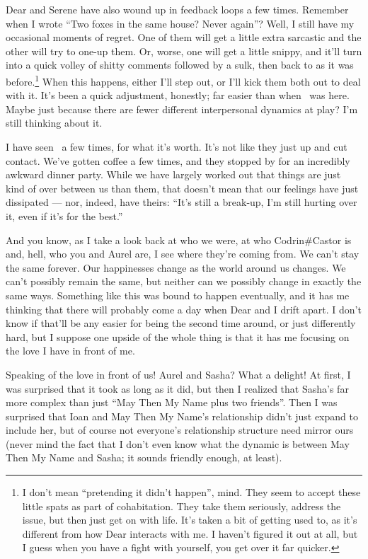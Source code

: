 Dear and Serene have also wound up in feedback loops a few times. Remember when I wrote ``Two foxes in the same house? Never again''? Well, I still have my occasional moments of regret. One of them will get a little extra sarcastic and the other will try to one-up them. Or, worse, one will get a little snippy, and it'll turn into a quick volley of shitty comments followed by a sulk, then back to as it was before.\footnote{I don't mean ``pretending it didn't happen'', mind. They seem to accept these little spats as part of cohabitation. They take them seriously, address the issue, but then just get on with life. It's taken a bit of getting used to, as it's different from how Dear interacts with me. I haven't figured it out at all, but I guess when you have a fight with yourself, you get over it far quicker.} When this happens, either I'll step out, or I'll kick them both out to deal with it. It's been a quick adjustment, honestly; far easier than when \Partner\ was here. Maybe just because there are fewer different interpersonal dynamics at play? I'm still thinking about it.

I have seen \Partner\ a few times, for what it's worth. It's not like they just up and cut contact. We've gotten coffee a few times, and they stopped by for an incredibly awkward dinner party. While we have largely worked out that things are just kind of over between us than them, that doesn't mean that our feelings have just dissipated — nor, indeed, have theirs: ``It's still a break-up, I'm still hurting over it, even if it's for the best.''

And you know, as I take a look back at who we were, at who Codrin\#Castor is and, hell, who you and Aurel are, I see where they're coming from. We can't stay the same forever. Our happinesses change as the world around us changes. We can't possibly remain the same, but neither can we possibly change in exactly the same ways. Something like this was bound to happen eventually, and it has me thinking that there will probably come a day when Dear and I drift apart. I don't know if that'll be any easier for being the second time around, or just differently hard, but I suppose one upside of the whole thing is that it has me focusing on the love I have in front of me.

Speaking of the love in front of us! Aurel and Sasha? What a delight! At first, I was surprised that it took as long as it did, but then I realized that Sasha's far more complex than just ``May Then My Name plus two friends''. Then I was surprised that Ioan and May Then My Name's relationship didn't just expand to include her, but of course not everyone's relationship structure need mirror ours (never mind the fact that I don't even know what the dynamic is between May Then My Name and Sasha; it sounds friendly enough, at least).

